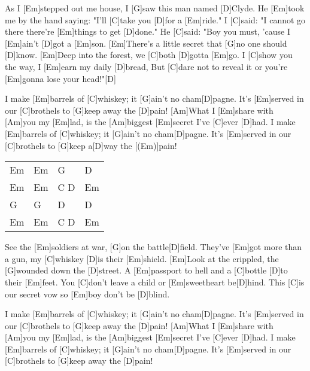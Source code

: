 

\begin{guitar}
	
	As I [Em]stepped out me house, I [G]saw this man named [D]Clyde. 
	He [Em]took me by the hand saying: "I'll [C]take you [D]for a [Em]ride." 
	I [C]said: "I cannot go there there're [Em]things to get [D]done." 
	He [C]said: "Boy you must, 'cause I [Em]ain't [D]got a [Em]son.
	[Em]There's a little secret that [G]no one should [D]know.
	[Em]Deep into the forest, we [C]both [D]gotta [Em]go.
	I [C]show you the way, I [Em]earn my daily [D]bread,
	But [C]dare not to reveal it or you're [Em]gonna lose your head!"[D]{}
	
	\begin{highlightbar}
		I make [Em]barrels of [C]whiskey; it [G]ain't no cham[D]pagne.
		It's [Em]served in our [C]brothels to [G]keep away the [D]pain! 
		[Am]What I [Em]share with [Am]you my [Em]lad, is the [Am]biggest [Em]secret I've [C]ever [D]had. 
		I make [Em]barrels of [C]whiskey; it [G]ain't no cham[D]pagne.
		It's [Em]served in our [C]brothels to [G]keep a[D]way the [(Em)]pain!
	\end{highlightbar}
	
	\songsection{Instrumental}
	{\footnotesize\begin{tabular}{|l|l|l|l|}
			Em & Em & G & D \\
			Em & Em & C D & Em\\
			G & G & D & D\\
			Em & Em & C D & Em 
	\end{tabular}}
	
	\songsection{Verse 2}
	See the [Em]soldiers at war, [G]on the battle[D]field.
	They've [Em]got more than a gun, my [C]whiskey [D]is their [Em]shield.
	[Em]Look at the crippled, the [G]wounded down the [D]street.
	A [Em]passport to hell and a [C]bottle [D]to their [Em]feet.
	You [C]don't leave a child or [Em]sweetheart be[D]hind.
	This [C]is our secret vow so [Em]boy don't be [D]blind.
	\pagebreak
	\begin{highlightbar}
		\songsection{Chorus}
		I make [Em]barrels of [C]whiskey; it [G]ain't no cham[D]pagne.
		It's [Em]served in our [C]brothels to [G]keep away the [D]pain! 
		[Am]What I [Em]share with [Am]you my [Em]lad, is the [Am]biggest [Em]secret I've [C]ever [D]had. 
		I make [Em]barrels of [C]whiskey; it [G]ain't no cham[D]pagne.
		It's [Em]served in our [C]brothels to [G]keep away the [D]pain!
	\end{highlightbar}
		

\end{guitar}
